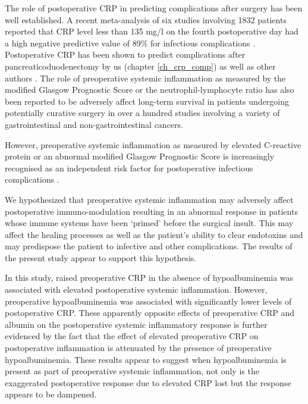 The role of postoperative CRP in predicting complications after surgery has been well established. 
A recent meta-analysis of six studies involving 1832 patients reported that CRP level less than 135 mg/l on the fourth postoperative day had a high negative predictive value of 89\% for infectious complications \parencite{warschkow_safe_2012}. 
Postoperative CRP has been shown to predict complications after pancreaticoduodenectomy by us (chapter \ref{ch_crp_comp}) as well as other authors \parencite{welsch_persisting_2008, hiyoshi_usefulness_2013, kosaka_multivariate_2014}.
The role of preoperative systemic inflammation as measured by the modified Glasgow Prognostic Score or the neutrophil-lymphocyte ratio has also been reported to be adversely affect long-term survival in patients undergoing potentially curative surgery in over a hundred studies involving a variety of gastrointestinal and non-gastrointestinal cancers. 

However, preoperative systemic inflammation as measured by elevated C-reactive protein or an abnormal modified Glasgow Prognostic Score is increasingly recognised as an independent risk factor for postoperative infectious complications \parencite{mohri_correlation_2014, kubo_elevated_2013, moyes_preoperative_2009}.

We hypothesized that preoperative systemic inflammation may adversely affect postoperative immuno-modulation resulting in an abnormal response in patients whose immune systems have been `primed' before the surgical insult. 
This may affect the healing processes as well as the patient's ability to clear endotoxins and may predispose the patient to infective and other complications.
The results of the present study appear to support this hypothesis. 

In this study, raised preoperative CRP in the absence of hypoalbuminemia was associated with elevated postoperative systemic inflammation.
However, preoperative hypoalbuminemia was associated with significantly lower levels of postoperative CRP.
These apparently opposite effects of preoperative CRP and albumin on the postoperative systemic inflammatory response is further evidenced by the fact that the effect of elevated preoperative CRP on postoperative inflammation is attenuated by the presence of preoperative hypoalbuminemia.
These results appear to suggest when hypoalbuminemia is present as part of preoperative systemic inflammation, not only is the exaggerated postoperative response due to elevated CRP lost but the response appears to be dampened. 

